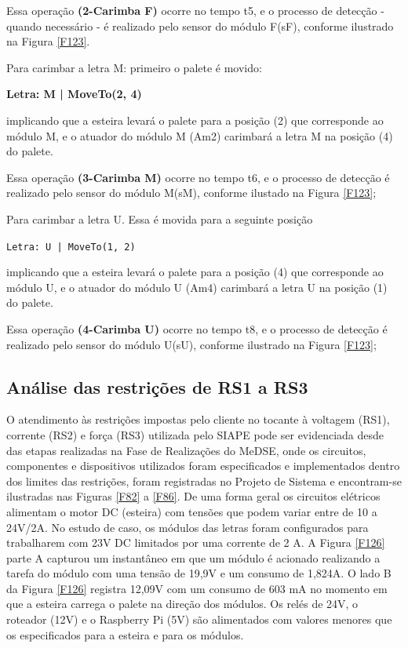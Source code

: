 \documentclass[10pt,letterpaper,twocolumn]{IEEEtran}
\begin{document}
					Essa operação \textbf{(2-Carimba F)} ocorre no tempo t5, e o processo de detecção - quando necessário - é realizado pelo sensor do módulo F(sF), conforme ilustrado na Figura \ref{F123}.
					
					
					Para carimbar a letra M: primeiro o palete é movido:
					\begin{center}
						\textbf{Letra: M | MoveTo(2, 4)}
					\end{center}
					implicando que a esteira levará o palete para a posição (2) que corresponde ao módulo M, e o atuador do módulo M (Am2) carimbará a letra M na posição (4) do palete. 
					
					Essa operação \textbf{(3-Carimba M)} ocorre no tempo t6, e o processo de detecção é realizado pelo sensor do módulo M(sM), conforme ilustado na Figura \ref{F123}; 
					
					Para carimbar a letra U. Essa é movida para a seguinte posição
					\begin{center}
						\texttt{Letra: U | MoveTo(1, 2)}
					\end{center}
					implicando que a esteira levará o palete para a posição (4) que corresponde ao módulo U, e o atuador do módulo U (Am4) carimbará a letra U na posição (1) do palete. 
					
					Essa operação \textbf{(4-Carimba U)} ocorre no tempo t8, e o processo de detecção é realizado pelo sensor do módulo U(sU), conforme ilustrado na Figura \ref{F123};
					
					
					\subsection{Análise das restrições de RS1 a RS3}	
					
					O atendimento às restrições impostas pelo cliente no tocante à voltagem (RS1), corrente (RS2) e força (RS3) utilizada pelo SIAPE pode ser evidenciada desde das etapas realizadas na Fase de Realizações do MeDSE, onde os circuitos, componentes e dispositivos utilizados foram especificados e implementados dentro dos limites das restrições, foram registradas no Projeto de Sistema e encontram-se ilustradas nas Figuras \ref{F82} a \ref{F86}. De uma forma geral os circuitos elétricos alimentam o motor DC (esteira) com tensões que podem variar entre de 10 a 24V/2A. No estudo de caso, os módulos das letras foram configurados para trabalharem com 23V DC limitados por uma corrente de 2 A. A Figura \ref{F126} parte A capturou um instantâneo em que um módulo é acionado realizando a tarefa do módulo com uma tensão de 19,9V e um consumo de 1,824A.  O lado B da Figura \ref{F126} registra 12,09V com um consumo de 603 mA no momento em que a esteira carrega o palete na direção dos módulos. Os relés de 24V, o roteador (12V) e o Raspberry Pi (5V) são alimentados com valores menores que os especificados para a esteira e para os módulos. 
					
\end{document}
